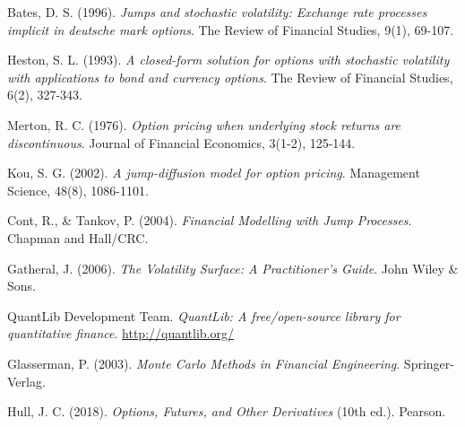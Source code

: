 \documentclass[12pt,a4paper]{article}
\begin{document}
\begin{thebibliography}{9}

Bates, D. S. (1996).
\textit{Jumps and stochastic volatility: Exchange rate processes implicit in deutsche mark options}.
The Review of Financial Studies, 9(1), 69-107.

Heston, S. L. (1993).
\textit{A closed-form solution for options with stochastic volatility with applications to bond and currency options}.
The Review of Financial Studies, 6(2), 327-343.

Merton, R. C. (1976).
\textit{Option pricing when underlying stock returns are discontinuous}.
Journal of Financial Economics, 3(1-2), 125-144.

Kou, S. G. (2002).
\textit{A jump-diffusion model for option pricing}.
Management Science, 48(8), 1086-1101.

Cont, R., \& Tankov, P. (2004).
\textit{Financial Modelling with Jump Processes}.
Chapman and Hall/CRC.

Gatheral, J. (2006).
\textit{The Volatility Surface: A Practitioner's Guide}.
John Wiley \& Sons.

QuantLib Development Team.
\textit{QuantLib: A free/open-source library for quantitative finance}.
\url{http://quantlib.org/}

Glasserman, P. (2003).
\textit{Monte Carlo Methods in Financial Engineering}.
Springer-Verlag.

Hull, J. C. (2018).
\textit{Options, Futures, and Other Derivatives} (10th ed.).
Pearson.

\end{thebibliography}
\end{document}
